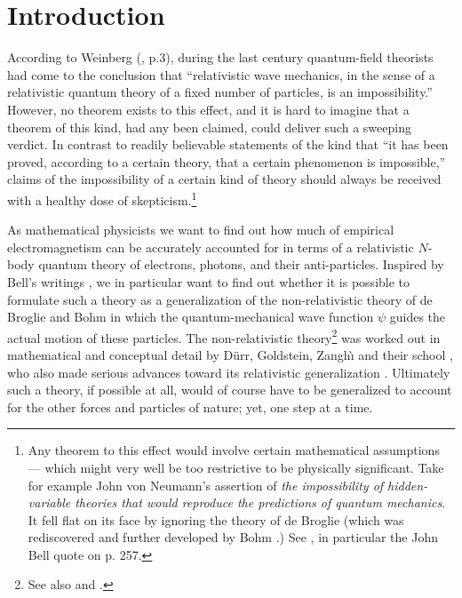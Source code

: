\documentclass[12pt]{article}
\theoremstyle{definition}
\numberwithin{equation}{section}
\begin{document}
\medskip


\newpage

\section{Introduction} %

 According to Weinberg (\cite{WeinbergBOOKqft}, p.3), during the last century quantum-field theorists had come 
to the conclusion that ``relativistic wave mechanics, in the sense of a relativistic quantum theory of a fixed 
number of particles, is an impossibility.''
 However, no theorem exists to this effect, and it is hard to imagine that a theorem of this kind, had any been claimed, 
could deliver such a sweeping verdict.
 In contrast to readily believable statements of the kind that 
``it has been proved, according to a certain theory, that  a certain phenomenon is impossible,'' 
claims of the impossibility of a certain kind of theory should always be received with a healthy dose of skepticism.\footnote{Any 
  theorem to this effect would involve certain mathematical assumptions --- which 
  might very well be too restrictive to be physically significant.
     Take for example John von Neumann's assertion \cite{JvN} of \emph{the impossibility of hidden-variable theories that would reproduce 
  the predictions of quantum mechanics}. It fell flat on its face by ignoring the theory of de Broglie \cite{deBroglieSOLVAY} 
(which was rediscovered and further developed by Bohm \cite{Bohm52}.) 
See \cite{BricmontBOOK}, in particular the John Bell quote on p. 257.}
         
 As mathematical physicists we want to find out how much of empirical electromagnetism can be accurately accounted for in terms of 
a relativistic $N$-body quantum theory of electrons, photons, and their anti-particles.
 Inspired by Bell's writings \cite{BellBOOKsec}, we in particular want to find out whether it is possible to formulate
such a theory as a generalization of the non-relativistic theory of de Broglie \cite{deBroglieSOLVAY} and Bohm \cite{Bohm52}
in which the quantum-mechanical wave function $\psi$ guides the actual motion of these particles.
 The non-relativistic theory\footnote{See also \cite{BoHi} and \cite{HollandBOOK}.}
 was worked out in mathematical and conceptual detail by D\"urr, Goldstein, Zangh\`{\i} and their school \cite{DGZ,DT}, 
 who also made serious advances toward its relativistic generalization \cite{BerndlETal,DGNSZ}.
 Ultimately such a theory, if possible at all, would of course have to be generalized to account for the other forces and 
particles of nature; yet, one step at a time. 
\end{document}
